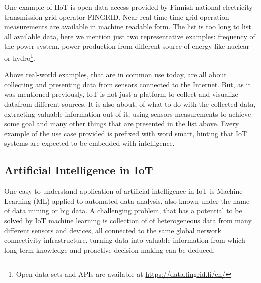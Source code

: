 \documentclass[english, 12pt, a4paper, elec, utf8, online]{aaltothesis}
\begin{document}
One example of IIoT is open data access provided by Finnish national electricity transmission grid operator FINGRID. Near real-time time grid operation measurements are available in machine readable form. The list is too long to list all available data, here we mention just two representative examples: frequency of the power system, power production from different source of energy like nuclear or hydro\footnote{Open data sets and APIs are available at \url{https://data.fingrid.fi/en/}}.  

Above real-world examples, that are in common use today, are all about collecting and presenting data from sensors connected to the Internet. But, as it was mentioned previously, IoT is not just a platform to collect and visualize datafrom different sources. It is also about, of what to do with the collected data, extracting valuable information out of it, using sensors measurements to achieve some goal and many other things that are presented in the list above. Every example of the use case provided is prefixed with word smart, hinting that IoT systems are expected to be embedded with intelligence. 


\subsection{Artificial Intelligence in IoT}
One easy to understand application of artificial intelligence in IoT is Machine Learning (ML) applied to automated data analysis, also known under the name of data mining or big data. A challenging problem, that has a potential to be solved by IoT machine learning is collection of of heterogeneous data from many different sensors and devices, all connected to the same global network connectivity infrastructure, turning data into valuable information from which long-term knowledge and proactive decision making can be deduced. 
\end{document}
